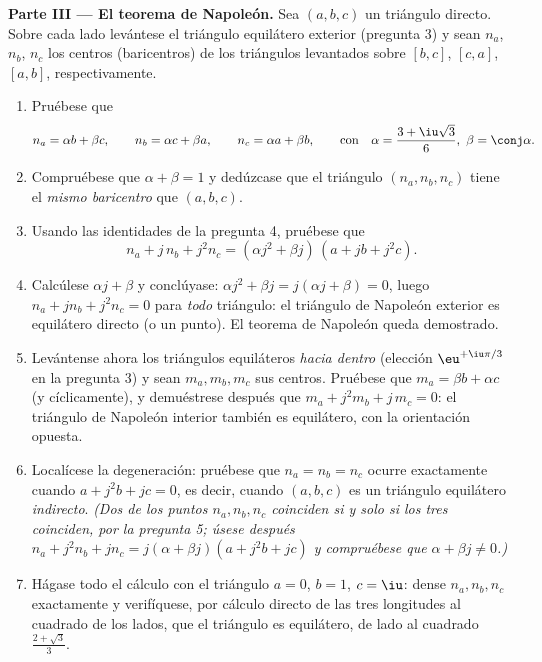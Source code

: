 \begin{problem}
\medskip
\noindent\textbf{Parte III --- El teorema de Napoleón.} Sea $(a, b, c)$
un triángulo directo. Sobre cada lado levántese el triángulo equilátero
exterior (pregunta 3) y sean $n_a$, $n_b$, $n_c$ los centros
(baricentros) de los triángulos levantados sobre $[b, c]$, $[c, a]$,
$[a, b]$, respectivamente.
\begin{enumerate}[resume]
  \item Pruébese que
        \[
        n_a = \alpha b + \beta c, \qquad
        n_b = \alpha c + \beta a, \qquad
        n_c = \alpha a + \beta b,
        \qquad\text{con}\quad
        \alpha = \frac{3 + \iu\sqrt3}{6},\ \beta = \conj\alpha .
        \]
  \item Compruébese que $\alpha + \beta = 1$ y dedúzcase que el
        triángulo $(n_a, n_b, n_c)$ tiene el \emph{mismo baricentro}
        que $(a, b, c)$.
  \item Usando las identidades de la pregunta 4, pruébese que
        \[
        n_a + j\,n_b + j^2 n_c
        = (\alpha j^2 + \beta j)\,(a + jb + j^2c) .
        \]
  \item Calcúlese $\alpha j + \beta$ y conclúyase: $\alpha j^2 +
        \beta j = j(\alpha j + \beta) = 0$, luego $n_a + j n_b + j^2
        n_c = 0$ para \emph{todo} triángulo: el triángulo de Napoleón
        exterior es equilátero directo (o un punto). El teorema de
        Napoleón queda demostrado.
  \item Levántense ahora los triángulos equiláteros \emph{hacia
        dentro} (elección $\eu^{+\iu\pi/3}$ en la pregunta 3) y sean
        $m_a, m_b, m_c$ sus centros. Pruébese que $m_a = \beta b +
        \alpha c$ (y cíclicamente), y demuéstrese después que
        $m_a + j^2 m_b + j\,m_c = 0$: el triángulo de Napoleón
        interior también es equilátero, con la orientación opuesta.
  \item Localícese la degeneración: pruébese que $n_a = n_b = n_c$
        ocurre exactamente cuando $a + j^2 b + jc = 0$, es decir,
        cuando $(a, b, c)$ es un triángulo equilátero
        \emph{indirecto}. \emph{(Dos de los puntos $n_a, n_b, n_c$
        coinciden si y solo si los tres coinciden, por la pregunta 5;
        úsese después $n_a + j^2 n_b + j n_c = j(\alpha + \beta j)(a +
        j^2b + jc)$ y compruébese que $\alpha + \beta j \neq 0$.)}
  \item Hágase todo el cálculo con el triángulo $a = 0$, $b = 1$,
        $c = \iu$: dense $n_a, n_b, n_c$ exactamente y verifíquese, por
        cálculo directo de las tres longitudes al cuadrado de los
        lados, que el triángulo es equilátero, de lado al cuadrado
        $\frac{2 + \sqrt3}{3}$.
\end{enumerate}


\end{problem}
